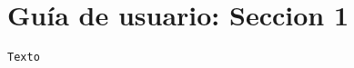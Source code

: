 \section{Gu\'ia de usuario: Seccion 1}
\label{Apendice2}

\begin{center}
\begin{footnotesize}

\begin{verbatim}
Texto
\end{verbatim}

\end{footnotesize}
\end{center}

